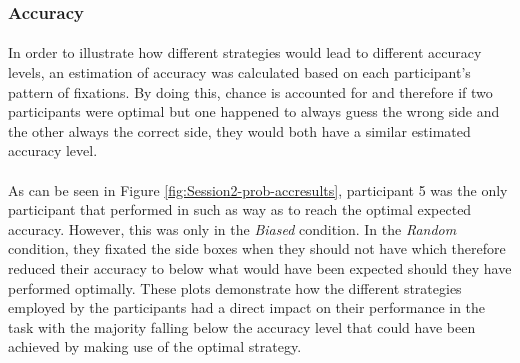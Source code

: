 \documentclass[12pt]{article}
\begin{document}


\subsubsection*{Accuracy}
\paragraph{} In order to illustrate how different strategies would lead to different accuracy levels, an estimation of accuracy was calculated based on each participant's pattern of fixations. By doing this, chance is accounted for and therefore if two participants were optimal but one happened to always guess the wrong side and the other always the correct side, they would both have a similar estimated accuracy level. 

\paragraph{} As can be seen in Figure \ref{fig:Session2-prob-accresults}, participant 5 was the only participant that performed in such as way as to reach the optimal expected accuracy. However, this was only in the \textit{Biased} condition. In the \textit{Random} condition, they fixated the side boxes when they should not have which therefore reduced their accuracy to below what would have been expected should they have performed optimally. These plots demonstrate how the different strategies employed by the participants had a direct impact on their performance in the task with the majority falling below the accuracy level that could have been achieved by making use of the optimal strategy. 
\end{document}
